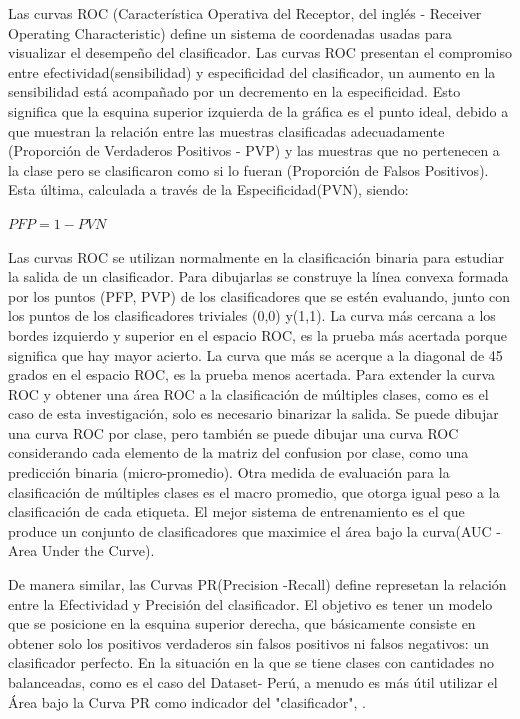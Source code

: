 	
	Las curvas ROC (Característica Operativa del Receptor, del inglés - Receiver Operating Characteristic) define un sistema de coordenadas usadas para visualizar el desempeño del clasificador. Las curvas ROC presentan el compromiso entre efectividad(sensibilidad) y especificidad del clasificador, un aumento en la sensibilidad está acompañado por un decremento en la especificidad. Esto significa que la esquina superior izquierda de la gráfica es el punto ideal, debido a que muestran la relación entre las muestras clasificadas adecuadamente (Proporción de Verdaderos Positivos - PVP) y las muestras que no pertenecen a la clase pero se clasificaron como si lo fueran (Proporción de Falsos Positivos). Esta última, calculada a través de la Especificidad(PVN), siendo:
	\begin{center}
	{$PFP= 1 - PVN$}
	\end{center}

	Las curvas ROC se utilizan normalmente en la clasificación binaria para estudiar la salida de un clasificador. Para dibujarlas se construye la línea convexa formada por los puntos (PFP, PVP) de los clasificadores que se estén evaluando, junto con los puntos de los clasificadores triviales (0,0) y(1,1). La curva más cercana a los bordes izquierdo y superior en el espacio ROC, es la prueba más acertada porque significa que hay mayor acierto. La curva que más se acerque a la diagonal de 45 grados en el espacio ROC, es la prueba menos acertada. Para extender la curva ROC y obtener una área ROC a la clasificación de múltiples clases, como es el caso de esta investigación, solo es necesario binarizar la salida. Se puede dibujar una curva ROC por clase, pero también se puede dibujar una curva ROC considerando cada elemento de la matriz del confusion por clase, como una predicción binaria (micro-promedio). Otra medida de evaluación para la clasificación de múltiples clases es el macro promedio, que otorga igual peso a la clasificación de cada etiqueta. El mejor sistema de entrenamiento es el que produce un conjunto de clasificadores que maximice el área bajo la curva(AUC - Area Under the Curve)\citep{SandovalCereza}.


	De manera similar, las Curvas PR(Precision -Recall) define represetan la relación entre la Efectividad y Precisión del clasificador. El objetivo es tener un modelo que se posicione en la esquina superior derecha, que básicamente consiste en obtener solo los positivos verdaderos sin falsos positivos ni falsos negativos: un clasificador perfecto. En la situación en la que se tiene clases con cantidades no balanceadas, como es el caso del Dataset- Perú, a menudo es más útil utilizar el Área bajo la Curva PR como indicador del "clasificador", \citep{Davis-2006-RPR-1143844-1143874}.


